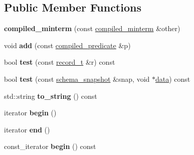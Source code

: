 \subsection*{Public Member Functions}
\begin{DoxyCompactItemize}
\item 
\mbox{\label{structdialog_1_1compiled__minterm_afdd934342e641b4071097f0029f24dda}} 
{\bfseries compiled\+\_\+minterm} (const \hyperlink{structdialog_1_1compiled__minterm}{compiled\+\_\+minterm} \&other)
\item 
\mbox{\label{structdialog_1_1compiled__minterm_a99bbaa3ee102bac991c7f5b9462ea6db}} 
void {\bfseries add} (const \hyperlink{structdialog_1_1compiled__predicate}{compiled\+\_\+predicate} \&p)
\item 
\mbox{\label{structdialog_1_1compiled__minterm_ad585db052a283a82ac0427bdfb08d84a}} 
bool {\bfseries test} (const \hyperlink{structdialog_1_1record__t}{record\+\_\+t} \&r) const
\item 
\mbox{\label{structdialog_1_1compiled__minterm_ad5ef016f44dd9ae9b07c0c024d88b7bc}} 
bool {\bfseries test} (const \hyperlink{classdialog_1_1schema__snapshot}{schema\+\_\+snapshot} \&snap, void $\ast$\hyperlink{structdialog_1_1data}{data}) const
\item 
\mbox{\label{structdialog_1_1compiled__minterm_a6bed1df725695a4e1d65939d26d6a08f}} 
std\+::string {\bfseries to\+\_\+string} () const
\item 
\mbox{\label{structdialog_1_1compiled__minterm_a618e489971929f887b6645e47fc6a659}} 
iterator {\bfseries begin} ()
\item 
\mbox{\label{structdialog_1_1compiled__minterm_a327e06d044a3ba799ee1a7793e6c28a7}} 
iterator {\bfseries end} ()
\item 
\mbox{\label{structdialog_1_1compiled__minterm_a5cf5c964cbaca5379729aa6adcc4cc7d}} 
const\+\_\+iterator {\bfseries begin} () const
\item 

\end{DoxyCompactItemize}
